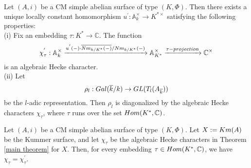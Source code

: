 \documentclass[10pt,a4paper]{amsart}
\begin{document}
      \begin{cor}\label{simple cm1} Let $(A, i)$ be a CM simple abelian surface of type $(K, \Phi)$. Then there exists a unique locally constant homomorphism $u^{'}: \mathbb{A}^{\times}_{k}\to K^{\ast\times }$ satisfying the following properties:
          \\\indent (i) Fix an embedding $\tau: K^{\ast}\to \mathbb{C}$. The function
          \begin{align}
              \chi^{'}_{\tau}: \mathbb{A}^{\times}_{k}\xrightarrow{u^{'}(-)\cdot \overline{{\rm Nm}_{k/K^{\ast}}(-)}/{\rm Nm}_{k/K^{\ast}}(-)}\mathbb{A}^{\times}_{K^{\ast}} \xrightarrow{\tau-{\rm projection}}\mathbb{C}^{\times}\notag 
          \end{align}
          is an algebraic Hecke character.
          \\\indent (ii) Let 
          \begin{align}
              \rho_{l}: {\rm Gal}(\overline{k}/k)\to GL(T_{l}(A_{\overline{k}})) \notag 
          \end{align}
          be the $l$-adic representation. Then $\rho_{l}$ is diagonalized by the algebraic Hecke characters $\chi_{\tau}$, where $\tau$ runs over the set ${\rm Hom}(K^{\ast}, \mathbb{C})$.
      \end{cor}

      \begin{prop}\label{onegai} Let $(A, i)$ be a CM simple abelian surface of type $(K, \Phi)$. Let $X:={\rm Km}(A)$ be the Kummer surface, and let $\chi_{\tau}$ be the algebraic Hecke characters in Theorem \ref{main theorem} for $X$. 
          Then, for every embedding $\tau\in {\rm Hom}(K^{\ast}, \mathbb{C})$, we have  $\chi_{\tau}=\chi^{'}_{\tau}$. 
      \end{prop}
\end{document}
